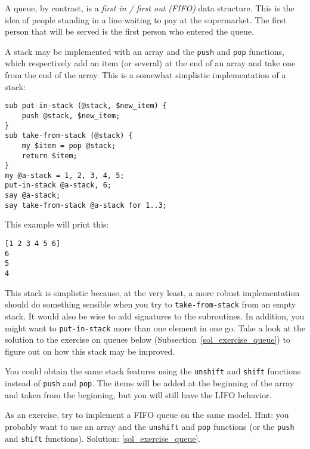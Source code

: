A queue, by contrast, is a \emph{first in / first out (FIFO)} data 
structure. This is the idea of people standing in a 
line waiting to pay at the supermarket. The first 
person that will be served is the first person who entered 
the queue.

A stack may be implemented with an array and the {\tt push} 
and {\tt pop} functions, which respectively add an item (or 
several) at the end of an array and take one from the end of 
the array. This is a somewhat simplistic implementation of 
a stack:
\label{stack_code}

\begin{verbatim}
sub put-in-stack (@stack, $new_item) {
    push @stack, $new_item;
}
sub take-from-stack (@stack) {
    my $item = pop @stack;
    return $item;
}
my @a-stack = 1, 2, 3, 4, 5;
put-in-stack @a-stack, 6;
say @a-stack;
say take-from-stack @a-stack for 1..3;
\end{verbatim}

This example will print this:

\begin{verbatim}
[1 2 3 4 5 6]
6
5
4
\end{verbatim}

This stack is simplistic because, at the very least, a more 
robust implementation should do something sensible when you 
try to {\tt take-from-stack} from an empty stack. It would 
also be wise to add signatures to the subroutines. In 
addition, you might want to {\tt put-in-stack} more than 
one element in one go. Take a look at the solution to the 
exercise on queues below (Subsection~\ref{sol_exercise_queue}) 
to figure out on how this stack may be improved.

You could obtain the same stack features using the  
{\tt unshift} and {\tt shift} functions instead of {\tt push} 
and {\tt pop}. The items will be added at the beginning of 
the array and taken from the beginning, but you will still 
have the LIFO behavior.

\label{exercise_queue}
As an exercise, try to implement a FIFO queue on the same model. 
Hint: you probably want to use an array and the {\tt unshift} 
and {\tt pop} functions (or the {\tt push} and {\tt shift} functions). Solution: \ref{sol_exercise_queue}.

